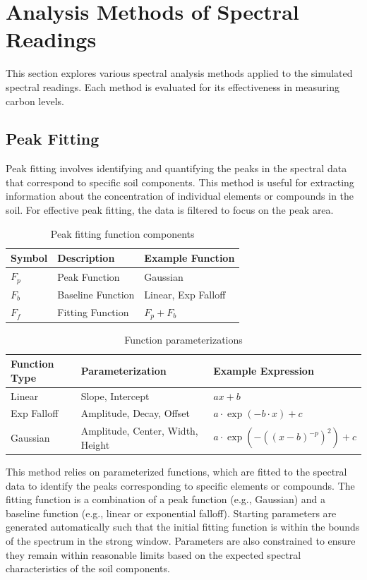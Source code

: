 \documentclass[review]{elsarticle}
\begin{document}
\section{Analysis Methods of Spectral Readings}

This section explores various spectral analysis methods applied to the simulated spectral readings. Each method is evaluated for its effectiveness in measuring carbon levels.

\subsection{Peak Fitting}

Peak fitting involves identifying and quantifying the peaks in the spectral data that correspond to specific soil components. This method is useful for extracting information about the concentration of individual elements or compounds in the soil. For effective peak fitting, the data is filtered to focus on the peak area.

\begin{table}[H]
\centering
\caption{Peak fitting function components}
\label{tab:peak_functions}
\begin{tabular}{@{}lll@{}}
\toprule
Symbol & Description & Example Function \\
\midrule
$F_p$ & Peak Function & Gaussian \\
$F_b$ & Baseline Function & Linear, Exp Falloff \\
$F_f$ & Fitting Function & $F_p + F_b$ \\
\bottomrule
\end{tabular}
\end{table}

\begin{table}[H]
\centering
\caption{Function parameterizations}
\label{tab:function_params}
\begin{tabular}{@{}lll@{}}
\toprule
Function Type & Parameterization & Example Expression \\
\midrule
Linear & Slope, Intercept & $ax + b$ \\
Exp Falloff & Amplitude, Decay, Offset & $a \cdot \exp(-b \cdot x) + c$ \\
Gaussian & Amplitude, Center, Width, Height & $a \cdot \exp(-((x - b)^{-p})^2) + c$ \\
\bottomrule
\end{tabular}
\end{table}

This method relies on parameterized functions, which are fitted to the spectral data to identify the peaks corresponding to specific elements or compounds. The fitting function is a combination of a peak function (e.g., Gaussian) and a baseline function (e.g., linear or exponential falloff). Starting parameters are generated automatically such that the initial fitting function is within the bounds of the spectrum in the strong window. Parameters are also constrained to ensure they remain within reasonable limits based on the expected spectral characteristics of the soil components.
\end{document}
